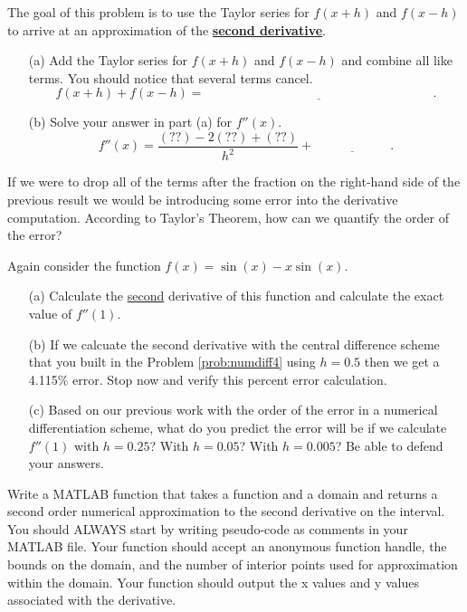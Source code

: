 \begin{problem}\label{prob:numdiff4}
    The goal of this problem is to use the Taylor series for $f(x+h)$ and $f(x-h)$ to arrive at an approximation of the
    \underline{ {\bf second derivative}}. 
    \begin{enumerate}
        \item[(a)] Add the Taylor series for $f(x+h)$ and $f(x-h)$ and combine all like
            terms.  You should notice that several terms cancel.
            \[ f(x+h) + f(x-h) = \underline{\hspace{3in}}. \]
        \item[(b)] Solve your answer in part (a) for $f''(x)$.
            \[ f''(x) = \frac{(??) - 2 (??) + (??)}{h^2} + \underline{\hspace{1in}}. \]
    \end{enumerate}
\end{problem}

\begin{problem}
    If we were to drop all of the terms after the fraction on the right-hand side of the
    previous result we would be introducing some error into the derivative computation.
    According to Taylor's Theorem, how can we quantify the order of the error?  
\end{problem}

\begin{problem}
    Again consider the function $f(x) = \sin(x) - x\sin(x)$. 
    \begin{enumerate}
        \item[(a)] Calculate the \underline{second} derivative of this function and
            calculate the exact value of $f''(1)$.
        \item[(b)] If we calcuate the second derivative with the central difference scheme
            that you built in the Problem \ref{prob:numdiff4} using $h = 0.5$ then we get
            a 4.115\% error.  Stop now and verify this percent error calculation.  
        \item[(c)] Based on our previous work with the order of the error in a numerical
            differentiation scheme, what do you predict the error will be if we calculate
            $f''(1)$ with $h = 0.25$?  With $h = 0.05$?  With $h = 0.005$?  Be able to
            defend your answers.
    \end{enumerate}
\end{problem}



\begin{problem}
    Write a MATLAB function that takes a function and a domain and returns a second order
    numerical approximation to the second derivative on the interval. You should ALWAYS start by writing pseudo-code as comments in your
    MATLAB file.    Your function should
    accept an anonymous function handle, the bounds on the domain, and the number of
    interior points used for approximation within the domain. Your function should output
    the x values and y values associated with the derivative.\\
\end{problem}

